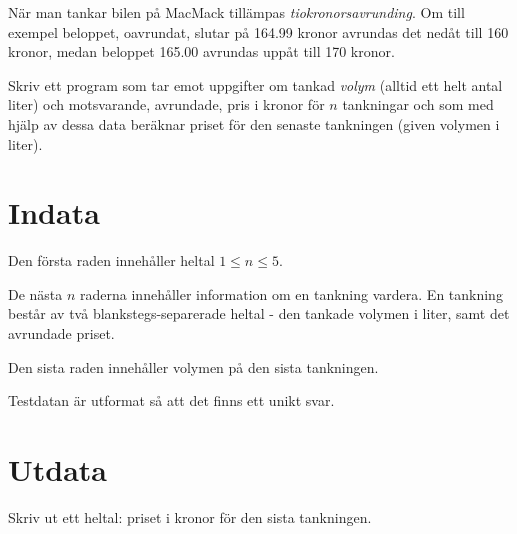 
När man tankar bilen på MacMack tillämpas \emph{tiokronorsavrunding}. Om till exempel beloppet, oavrundat, slutar på
164.99 kronor avrundas det nedåt till 160 kronor, medan beloppet 165.00 avrundas uppåt till 170 kronor.

Skriv ett program som tar emot uppgifter om tankad \emph{volym} (alltid ett helt antal liter) och motsvarande,
avrundade, pris i kronor för $n$ tankningar och som med hjälp av dessa data beräknar priset för den senaste tankningen
(given volymen i liter).

\section*{Indata}
Den första raden innehåller heltal $1 \le n \le 5$. 

De nästa $n$ raderna innehåller information om en tankning vardera. En tankning består av två blankstegs-separerade heltal - den tankade volymen i liter,
samt det avrundade priset.

Den sista raden innehåller volymen på den sista tankningen.

Testdatan är utformat så att det finns ett unikt svar.

\section*{Utdata}
Skriv ut ett heltal: priset i kronor för den sista tankningen.
